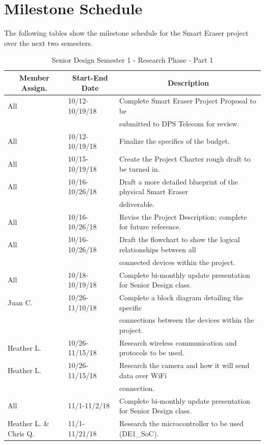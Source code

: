 \section{Milestone Schedule}
The following tables show the milestone schedule for the Smart Eraser project over the next two semesters.
\setlength{\parindent}{5ex}
\begin{table} [H]	
	\normalsize
	\centering
	\begin{tabular}{|l|l|l|}
		\hline
		\multicolumn{1}{|c|}{\textbf{Member Assign.}} & \multicolumn{1}{|c|}{\textbf{Start-End Date}} & \multicolumn{1}{|c|}{\textbf{Description}} \\
		\hline
		All & 10/12-10/19/18 & Complete Smart Eraser Project Proposal to be\\
		& & submitted to DPS Telecom for review. \\
		\hline
		All & 10/12-10/19/18 & Finalize the specifics of the budget. \\
		\hline
		All & 10/15-10/19/18 & 
		Create the Project Charter rough draft to be turned in.\\
		\hline
		All & 10/16-10/26/18 & Draft a more detailed blueprint of the physical Smart Eraser \\
		& & deliverable. \\
		\hline
		All & 10/16-10/26/18 & 
		Revise the Project Description; complete for future reference.\\
		\hline
		All & 10/16-10/26/18 & 
		Draft the flowchart to show the logical relationships between all \\
		& & connected devices within the project.\\
		\hline
		All & 10/18-10/19/18 & 
		Complete bi-monthly update presentation for Senior Design class.\\
		\hline
		Juan C. & 10/26-11/10/18 & 
		Complete a block diagram detailing the specific \\
		& & connections between the devices within the project.\\
		\hline
		Heather L. & 10/26-11/15/18 & 
		Research wireless communication and protocols to be used.\\
		\hline
		Heather L. & 10/26-11/15/18 & 
		Research the camera and how it will send data over WiFi \\
		& & connection.\\
		\hline
		All & 11/1-11/2/18 & 
		Complete bi-monthly update presentation for Senior Design class.\\
		\hline
		Heather L. \& Chris Q. & 11/1-11/21/18 & 
		Research the microcontroller to be used  (DE1\_SoC).\\
		\hline
		
\end{tabular} 
\caption{Senior Design Semester 1 - Research Phase - Part 1}
\label{table:3}
\end{table}		

